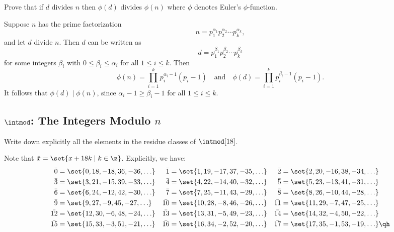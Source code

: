 \begin{exercise}\label{ex0.2.11}
    Prove that if $d$ divides $n$ then $\phi(d)$ divides $\phi(n)$ where $\phi$ denotes Euler's $\phi$-function.
\end{exercise}

\begin{sol}
    Suppose $n$ has the prime factorization
    \[n = p_1^{\alpha_1} p_2^{\alpha_2} \cdots p_k^{\alpha_k},\]
    and let $d$ divide $n$. Then $d$ can be written as
    \[d = p_1^{\beta_1} p_2^{\beta_2} \cdots p_k^{\beta_k}\]
    for some integers $\beta_i$ with $0 \leq \beta_i \leq \alpha_i$ for all $1 \leq i \leq k$. Then
    \[\phi(n) = \prod_{i=1}^k p_i^{\alpha_i - 1}(p_i - 1) \quad \text{and} \quad \phi(d) = \prod_{i=1}^k p_i^{\beta_i - 1}(p_i - 1).\]
    It follows that $\phi(d) \mid \phi(n)$, since $\alpha_i - 1 \geq \beta_i - 1$ for all $1 \leq i \leq k$.
\end{sol}

\newpage

\subsection{\texorpdfstring{$\intmod$: The Integers Modulo $n$}{Z/nZ: The Integers Modulo n}}

\begin{exercise}\label{ex0.3.1}
    Write down explicitly all the elements in the residue classes of $\intmod[18]$.
\end{exercise}

\begin{sol}
    Note that $\bar x = \set{x + 18k \mid k \in \z}$. Explicitly, we have:
    \begin{align*}
        \bar 0 & = \set{0, 18, -18, 36, -36, \ldots} & \bar 1 & = \set{1, 19, -17, 37, -35, \ldots} & \bar 2 & = \set{2, 20, -16, 38, -34, \ldots} \\
        \bar 3 & = \set{3, 21, -15, 39, -33, \ldots} & \bar 4 & = \set{4, 22, -14, 40, -32, \ldots} & \bar 5 & = \set{5, 23, -13, 41, -31, \ldots} \\
        \bar 6 & = \set{6, 24, -12, 42, -30, \ldots} & \bar 7 & = \set{7, 25, -11, 43, -29, \ldots} & \bar 8 & = \set{8, 26, -10, 44, -28, \ldots} \\
        \bar 9 & = \set{9, 27, -9, 45, -27, \ldots} & \bar{10} & = \set{10, 28, -8, 46, -26, \ldots} & \bar{11} & = \set{11, 29, -7, 47, -25, \ldots} \\
        \bar{12} & = \set{12, 30, -6, 48, -24, \ldots} & \bar{13} & = \set{13, 31, -5, 49, -23, \ldots} & \bar{14} & = \set{14, 32, -4, 50, -22, \ldots} \\
        \bar{15} & = \set{15, 33, -3, 51, -21, \ldots} & \bar{16} & = \set{16, 34, -2, 52, -20, \ldots} & \bar{17} & = \set{17, 35, -1, 53, -19, \ldots} \qh
    \end{align*}
\end{sol}

